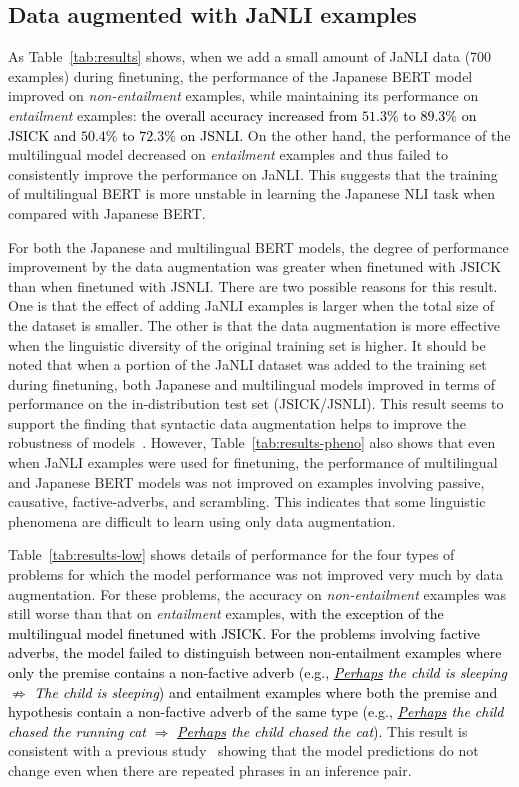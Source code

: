 \documentclass[11pt]{article}
\newcommand{\km}[1]{\textcolor{black}{#1}}
\begin{document}
\subsection{Data augmented with JaNLI examples}
\label{ssec:augment}
As Table~\ref{tab:results} shows, when we add a small amount of JaNLI data (700 examples) during finetuning, the performance of the Japanese BERT model improved on \textit{non-entailment} examples, while maintaining its performance on \textit{entailment} examples: \km{the overall accuracy increased from $51.3\%$ to $89.3\%$ on JSICK and $50.4\%$ to $72.3\%$ on JSNLI.}
On the other hand, the performance of the multilingual model decreased on \textit{entailment} examples and thus failed to consistently improve the performance on JaNLI.
This suggests that the training of multilingual BERT is more unstable in learning
the Japanese NLI task when compared with Japanese BERT.

For both the Japanese and multilingual BERT models, the degree of performance improvement by the data augmentation was greater when finetuned with JSICK
than when finetuned with JSNLI.
There are two possible reasons for this result.
One is that the effect of adding JaNLI examples is larger when the total size of the dataset is smaller.
The other is that the data augmentation is more effective when the linguistic diversity of the original training set is higher.
It should be noted that when a portion of the JaNLI dataset was added to the training set during finetuning, both Japanese and multilingual models improved in terms of performance on the in-distribution test set (JSICK/JSNLI).
This result seems to support the finding that syntactic data augmentation helps to improve the robustness of models~\cite{min-etal-2020-syntactic}.
However, Table~\ref{tab:results-pheno} also shows that even when JaNLI examples were used for finetuning, the performance of multilingual and Japanese BERT models was not improved on examples involving passive, causative, factive-adverbs, and scrambling.
This indicates that some linguistic phenomena are difficult to learn
using only data augmentation.

Table~\ref{tab:results-low} shows details of performance for the four types of problems
for which the model performance was not improved very much by data augmentation.
For these problems, the accuracy on \textit{non-entailment} examples was still worse than that on \textit{entailment} examples, \km{with the exception of the multilingual model finetuned with JSICK.}
\km{For the problems involving factive adverbs, the model failed to distinguish between non-entailment examples where only the premise contains a non-factive adverb
(e.g., \textit{\underline{Perhaps} the child is sleeping} $\not\Rightarrow$ \textit{The child is sleeping}) and entailment examples where both the premise and hypothesis contain a non-factive adverb of the same type
(e.g., \textit{\underline{Perhaps} the child chased the running cat}
$\Rightarrow$ \textit{\underline{Perhaps} the child chased the cat}).}
This result is consistent with a previous study~\cite{DBLP:conf/aaai/GuptaKS21} showing that the model predictions do not change even when there are repeated phrases in an inference pair.
\end{document}

